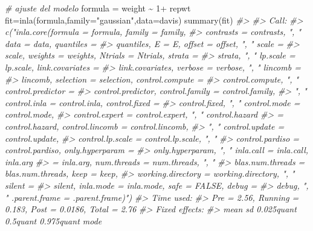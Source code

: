 \documentclass[
]{book}
\newenvironment{Shaded}{\begin{snugshade}}{\end{snugshade}}
\newcommand{\AttributeTok}[1]{\textcolor[rgb]{0.77,0.63,0.00}{#1}}
\newcommand{\CommentTok}[1]{\textcolor[rgb]{0.56,0.35,0.01}{\textit{#1}}}
\newcommand{\DecValTok}[1]{\textcolor[rgb]{0.00,0.00,0.81}{#1}}
\newcommand{\FunctionTok}[1]{\textcolor[rgb]{0.00,0.00,0.00}{#1}}
\newcommand{\NormalTok}[1]{#1}
\newcommand{\OtherTok}[1]{\textcolor[rgb]{0.56,0.35,0.01}{#1}}
\newcommand{\SpecialCharTok}[1]{\textcolor[rgb]{0.00,0.00,0.00}{#1}}
\newcommand{\StringTok}[1]{\textcolor[rgb]{0.31,0.60,0.02}{#1}}
\begin{document}
\begin{Shaded}
\begin{Highlighting}[]
\CommentTok{\# ajuste del modelo }
\NormalTok{formula }\OtherTok{=}\NormalTok{ weight }\SpecialCharTok{\textasciitilde{}} \DecValTok{1}\SpecialCharTok{+}\NormalTok{ repwt}
\NormalTok{fit}\OtherTok{=}\FunctionTok{inla}\NormalTok{(formula,}\AttributeTok{family=}\StringTok{"gaussian"}\NormalTok{,}\AttributeTok{data=}\NormalTok{davis)}
\FunctionTok{summary}\NormalTok{(fit)}
\CommentTok{\#\textgreater{} }
\CommentTok{\#\textgreater{} Call:}
\CommentTok{\#\textgreater{}    c("inla.core(formula = formula, family = family, }
\CommentTok{\#\textgreater{}    contrasts = contrasts, ", " data = data, quantiles = }
\CommentTok{\#\textgreater{}    quantiles, E = E, offset = offset, ", " scale = }
\CommentTok{\#\textgreater{}    scale, weights = weights, Ntrials = Ntrials, strata = }
\CommentTok{\#\textgreater{}    strata, ", " lp.scale = lp.scale, link.covariates = }
\CommentTok{\#\textgreater{}    link.covariates, verbose = verbose, ", " lincomb = }
\CommentTok{\#\textgreater{}    lincomb, selection = selection, control.compute = }
\CommentTok{\#\textgreater{}    control.compute, ", " control.predictor = }
\CommentTok{\#\textgreater{}    control.predictor, control.family = control.family, }
\CommentTok{\#\textgreater{}    ", " control.inla = control.inla, control.fixed = }
\CommentTok{\#\textgreater{}    control.fixed, ", " control.mode = control.mode, }
\CommentTok{\#\textgreater{}    control.expert = control.expert, ", " control.hazard }
\CommentTok{\#\textgreater{}    = control.hazard, control.lincomb = control.lincomb, }
\CommentTok{\#\textgreater{}    ", " control.update = control.update, }
\CommentTok{\#\textgreater{}    control.lp.scale = control.lp.scale, ", " }
\CommentTok{\#\textgreater{}    control.pardiso = control.pardiso, only.hyperparam = }
\CommentTok{\#\textgreater{}    only.hyperparam, ", " inla.call = inla.call, inla.arg }
\CommentTok{\#\textgreater{}    = inla.arg, num.threads = num.threads, ", " }
\CommentTok{\#\textgreater{}    blas.num.threads = blas.num.threads, keep = keep, }
\CommentTok{\#\textgreater{}    working.directory = working.directory, ", " silent = }
\CommentTok{\#\textgreater{}    silent, inla.mode = inla.mode, safe = FALSE, debug = }
\CommentTok{\#\textgreater{}    debug, ", " .parent.frame = .parent.frame)") }
\CommentTok{\#\textgreater{} Time used:}
\CommentTok{\#\textgreater{}     Pre = 2.56, Running = 0.183, Post = 0.0186, Total = 2.76 }
\CommentTok{\#\textgreater{} Fixed effects:}
\CommentTok{\#\textgreater{}              mean    sd 0.025quant 0.5quant 0.975quant mode}

\end{Highlighting}
\end{Shaded}
\end{document}
